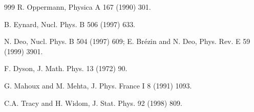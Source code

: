 \begin{thebibliography}{999}
   R. Oppermann, Physica A 167 (1990) 301.

      B. Eynard,
                      Nucl. Phys. B 506 (1997) 633.               %

         N. Deo, 
                      Nucl. Phys. B 504 (1997) 609;               %
                      E. Br\'ezin and N. Deo, 
                      Phys. Rev. E 59 (1999) 3901.

  F. Dyson,
                      J. Math. Phys. 13 (1972) 90.                %

   G. Mahoux and M. Mehta, 
                      J. Phys. France I 8 (1991) 1093.            %

     C.A. Tracy and  H. Widom,
                      J. Stat. Phys. 92 (1998) 809.               %

\end{thebibliography}



